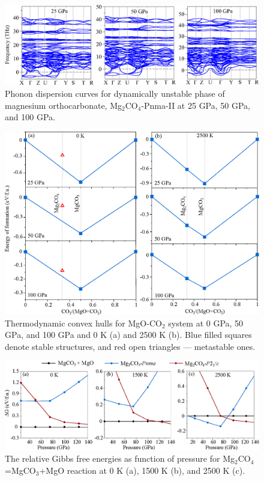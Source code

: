\documentclass[a4paperm]{article}
\begin{document}
\begin{figure}[H]
	\includegraphics[width=\textwidth]{phon_Mg_Ca} \centering
	\caption{Phonon dispersion curves for dynamically unstable phase of magnesium orthocarbonate, Mg$_2$CO$_4$-Pnma-II at 25 GPa, 50 GPa, and 100 GPa.} \label{phon_PnmaII}
\end{figure}

\begin{figure}[H]
	\includegraphics[width=\textwidth]{conv_hull} \centering
	\caption{Thermodynamic convex hulls for MgO-CO$_2$ system at  0 GPa, 50 GPa, and 100 GPa and 0 K (a) and 2500 K (b). Blue filled squares denote stable structures, and red open triangles --- metastable ones.} \label{conv_hull}
\end{figure}


\begin{figure}[H]
	\includegraphics[width=\textwidth]{transition} \centering
	\caption{The relative Gibbs free energies as function of pressure for Mg$_2$CO$_4$=MgCO$_3$+MgO reaction at 0 K (a), 1500 K (b), and 2500 K (c).} \label{gibbs}
\end{figure}
\end{document}
